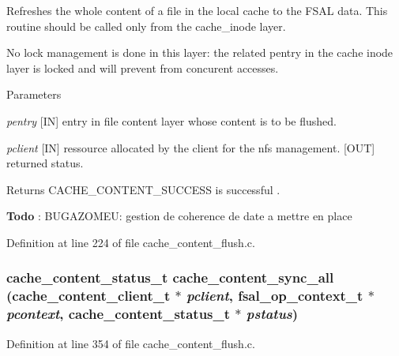 Refreshes the whole content of a file in the local cache to the FSAL data. This routine should be called only from the cache\_\-inode layer.

No lock management is done in this layer: the related pentry in the cache inode layer is locked and will prevent from concurent accesses.


\begin{DoxyParams}{Parameters}
\item[{\em pentry}][IN] entry in file content layer whose content is to be flushed. \item[{\em pclient}][IN] ressource allocated by the client for the nfs management.  [OUT] returned status.\end{DoxyParams}
\begin{DoxyReturn}{Returns}
CACHE\_\-CONTENT\_\-SUCCESS is successful .
\end{DoxyReturn}
\begin{Desc}
\item[{\bf Todo}]: BUGAZOMEU: gestion de coherence de date a mettre en place \end{Desc}


Definition at line 224 of file cache\_\-content\_\-flush.c.
\subsubsection[{cache\_\-content\_\-sync\_\-all}]{\setlength{\rightskip}{0pt plus 5cm}cache\_\-content\_\-status\_\-t cache\_\-content\_\-sync\_\-all (cache\_\-content\_\-client\_\-t $\ast$ {\em pclient}, \/  fsal\_\-op\_\-context\_\-t $\ast$ {\em pcontext}, \/  cache\_\-content\_\-status\_\-t $\ast$ {\em pstatus})}\label{cache__content__flush_8c_a479b822aceaf5a1bc414d603b250cc84}


Definition at line 354 of file cache\_\-content\_\-flush.c.